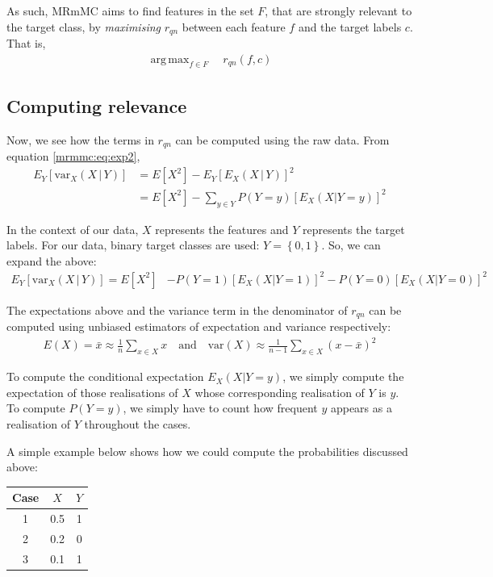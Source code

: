 \documentclass[12pt, twoside, a4paper]{report}
\def\var{\text{var}}
\DeclareMathOperator*{\argmax}{arg\,max}
\begin{document}
As such, MRmMC aims to find features in the set $F$, that are strongly relevant to the target class, by \textit{maximising} $r_{qn}$ between each feature $f$ and the target labels $c$. That is,
\begin{align*}
\argmax_{f \in F} \quad r_{qn}(f, c)
\end{align*}

\subsection{Computing relevance}
Now, we see how the terms in $r_{qn}$ can be computed using the raw data. From equation \ref{mrmmc:eq:exp2},
\begin{align*}
E_Y [ \var_X(X \, | \, Y) ]
&= E[X^2] - E_Y [ E_X(X\,|\,Y) ] ^2 \\
&= E[X^2] - \sum_{y \in Y} P(Y=y) \left[ E_X(X|Y=y) \right]^2 
\end{align*}

In the context of our data, $X$ represents the features and $Y$ represents the target labels. For our data, binary target classes are used: $Y= \left\lbrace 0,1 \right\rbrace$. So, we can expand the above:
\begin{align*}
E_Y [ \var_X(X \, | \, Y) ]
= E[X^2] &- P(Y=1) \left[ E_X(X|Y=1) \right]^2 - P(Y=0) \left[ E_X(X|Y=0) \right]^2 
\end{align*}

The expectations above and the variance term in the denominator of $r_{qn}$ can be computed using unbiased estimators of expectation and variance respectively:
\begin{align*}
E(X) = \bar{x} \approx \frac{1}{n} \sum_{x \in X} x \quad \text{and} \quad \var(X) \approx \frac{1}{n-1} \sum_{x \in X} (x- \bar{x})^2
\end{align*}

To compute the conditional expectation $E_X(X|Y=y)$, we simply compute the expectation of those realisations of $X$ whose corresponding realisation of $Y$ is $y$. To compute $P(Y=y)$, we simply have to count how frequent $y$ appears as a realisation of $Y$ throughout the cases.

A simple example below shows how we could compute the probabilities discussed above:

\begin{center}
    \begin{tabular}{| c || c | c |}
    \hline
     Case & $X$ & $Y$ \\ \hline \hline
     1 & 0.5 & 1 \\ \hline
     2 & 0.2 & 0 \\ \hline
     3 & 0.1 & 1 \\ \hline
    \end{tabular}
\end{center}
\end{document}
